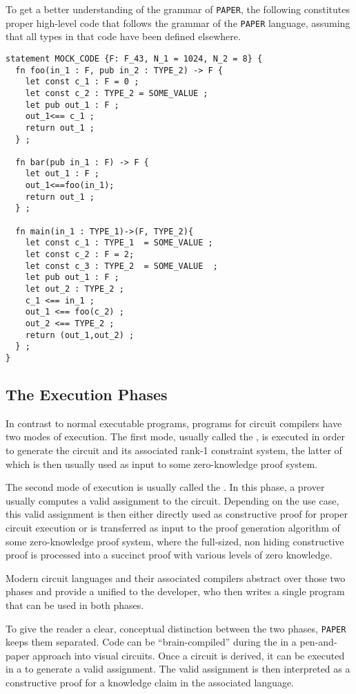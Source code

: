 \begin{example}To get a better understanding of the grammar of \texttt{PAPER}, the following constitutes proper high-level code that follows the grammar of the \texttt{PAPER} language, assuming that all types in that code have been defined elsewhere. 
\begin{lstlisting}
statement MOCK_CODE {F: F_43, N_1 = 1024, N_2 = 8} {
  fn foo(in_1 : F, pub in_2 : TYPE_2) -> F {
    let const c_1 : F = 0 ;
    let const c_2 : TYPE_2 = SOME_VALUE ;
    let pub out_1 : F ;
    out_1<== c_1 ;
    return out_1 ;
  } ;
  
  fn bar(pub in_1 : F) -> F {
    let out_1 : F ;
    out_1<==foo(in_1);
    return out_1 ;
  } ;
    
  fn main(in_1 : TYPE_1)->(F, TYPE_2){
    let const c_1 : TYPE_1  = SOME_VALUE ;
    let const c_2 : F = 2;
    let const c_3 : TYPE_2  = SOME_VALUE  ;
    let pub out_1 : F ;
    let out_2 : TYPE_2 ;
    c_1 <== in_1 ;
    out_1 <== foo(c_2) ;
    out_2 <== TYPE_2 ;
    return (out_1,out_2) ;
  } ;
}
\end{lstlisting}
\end{example}
\subsection{The Execution Phases} In contrast to normal executable programs, programs for circuit compilers have two modes of execution. The first mode, usually called the  , is executed in order to generate the circuit and its associated rank-1 constraint system, the latter of which is then usually used as input to some zero-knowledge proof system.

The second mode of execution is usually called the . In this phase, a prover usually computes a valid assignment to the circuit. Depending on the use case, this valid assignment is then either directly used as constructive proof for proper circuit execution or is transferred as input to the proof generation algorithm of some zero-knowledge proof system, where the full-sized, non hiding constructive proof is processed into a succinct proof with various levels of zero knowledge.

Modern circuit languages and their associated compilers abstract over those two phases and provide a unified  to the developer, who then writes a single program that can be used in both phases.

To give the reader a clear, conceptual distinction between the two phases, \texttt{PAPER} keeps them separated. Code can be ``brain-compiled'' during the  in a pen-and-paper approach into visual circuits. Once a circuit is derived, it can be executed in a  to generate a valid assignment. The valid assignment is then interpreted as a constructive proof for a knowledge claim in the associated language.
